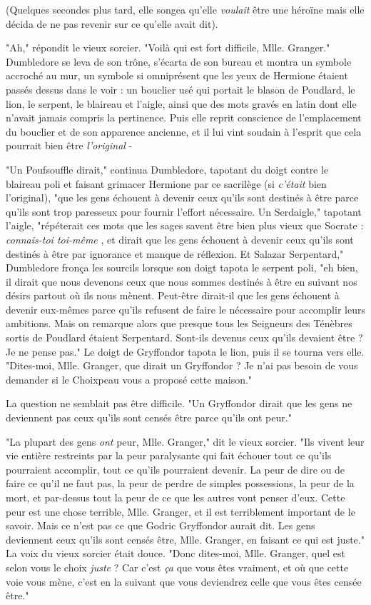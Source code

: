 (Quelques secondes plus tard, elle songea qu'elle \emph{voulait}  être une héroïne mais elle décida de ne pas revenir sur ce qu'elle avait dit).

"Ah," répondit le vieux sorcier. "Voilà qui est fort difficile, Mlle. Granger." Dumbledore se leva de son trône, s'écarta de son bureau et montra un symbole accroché au mur, un symbole si omniprésent que les yeux de Hermione étaient passés dessus dans le voir : un bouclier usé qui portait le blason de Poudlard, le lion, le serpent, le blaireau et l'aigle, ainsi que des mots gravés en latin dont elle n'avait jamais compris la pertinence. Puis elle reprit conscience de l'emplacement du bouclier et de son apparence ancienne, et il lui vint soudain à l'esprit que cela pourrait bien être \emph{l'original}  -

"Un Poufsouffle dirait," continua Dumbledore, tapotant du doigt contre le blaireau poli et faisant grimacer Hermione par ce sacrilège (si \emph{c'était}  bien l'original), "que les gens échouent à devenir ceux qu'ils sont destinés à être parce qu'ils sont trop paresseux pour fournir l'effort nécessaire. Un Serdaigle," tapotant l'aigle, "répéterait ces mots que les sages savent être bien plus vieux que Socrate : \emph{connais-toi toi-même} , et dirait que les gens échouent à devenir ceux qu'ils sont destinés à être par ignorance et manque de réflexion. Et Salazar Serpentard," Dumbledore fronça les sourcils lorsque son doigt tapota le serpent poli, "eh bien, il dirait que nous devenons ceux que nous sommes destinés à être en suivant nos désirs partout où ils nous mènent. Peut-être dirait-il que les gens échouent à devenir eux-mêmes parce qu'ils refusent de faire le nécessaire pour accomplir leurs ambitions. Mais on remarque alors que presque tous les Seigneurs des Ténèbres sortis de Poudlard étaient Serpentard. Sont-ils devenus ceux qu'ils devaient être ? Je ne pense pas." Le doigt de Gryffondor tapota le lion, puis il se tourna vers elle. "Dites-moi, Mlle. Granger, que dirait un Gryffondor ? Je n'ai pas besoin de vous demander si le Choixpeau vous a proposé cette maison."

La question ne semblait pas être difficile. "Un Gryffondor dirait que les gens ne deviennent pas ceux qu'ils sont censés être parce qu'ils ont peur."

"La plupart des gens \emph{ont}  peur, Mlle. Granger," dit le vieux sorcier. "Ils vivent leur vie entière restreints par la peur paralysante qui fait échouer tout ce qu'ils pourraient accomplir, tout ce qu'ils pourraient devenir. La peur de dire ou de faire ce qu'il ne faut pas, la peur de perdre de simples possessions, la peur de la mort, et par-dessus tout la peur de ce que les autres vont penser d'eux. Cette peur est une chose terrible, Mlle. Granger, et il est terriblement important de le savoir. Mais ce n'est pas ce que Godric Gryffondor aurait dit. Les gens deviennent ceux qu'ils sont censés être, Mlle. Granger, en faisant ce qui est juste." La voix du vieux sorcier était douce. "Donc dites-moi, Mlle. Granger, quel est selon vous le choix \emph{juste } ? Car c'est \emph{ça}  que vous êtes vraiment, et où que cette voie vous mène, c'est en la suivant que vous deviendrez celle que vous êtes censée être."

